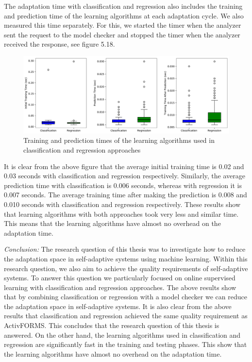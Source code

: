 \documentclass[a4paper,12pt]{article}
\begin{document}
The adaptation time with classification and regression also includes the training and prediction time of the learning algorithms at each adaptation cycle. We also measured this time separately. For this, we started the timer when the analyzer sent the request to the model checker and stopped the timer when the analyzer received the response, see figure 5.18.
\begin{figure}[H]
	\centering
	\includegraphics[keepaspectratio, width=\linewidth]{graphs/TimeMeasurement.pdf}
	\caption{Training and prediction times of the learning algorithms used in classification and regression approaches}
	\label{TimeMeasurement}
\end{figure}
It is clear from the above figure that the average initial training time is 0.02 and 0.03 seconds with classification and regression respectively. Similarly, the average prediction time with classification is 0.006 seconds, whereas with regression it is 0.007 seconds. The average training time after making the prediction is 0.008 and 0.010 seconds with classification and regression respectively. These results show that learning algorithms with both approaches took very less and similar time. This means that the learning algorithms have almost no overhead on the adaptation time.

\emph{Conclusion:} The research question of this thesis was to investigate how to reduce the adaptation space in self-adaptive systems using machine learning. Within this research question, we also aim to achieve the quality requirements of self-adaptive systems. To answer this question we particularly focused on online supervised learning with classification and regression approaches. The above results show that by combining classification or regression with a model checker we can reduce the adaptation space in self-adaptive systems. It is also clear from the above results that classification and regression achieved the same quality requirement as ActivFORMS. This concludes that the research question of this thesis is answered. On the other hand, the learning algorithms used in classification and regression are significantly fast in the training and testing phases. This show that the learning algorithms have almost no overhead on the adaptation time.
\end{document}
